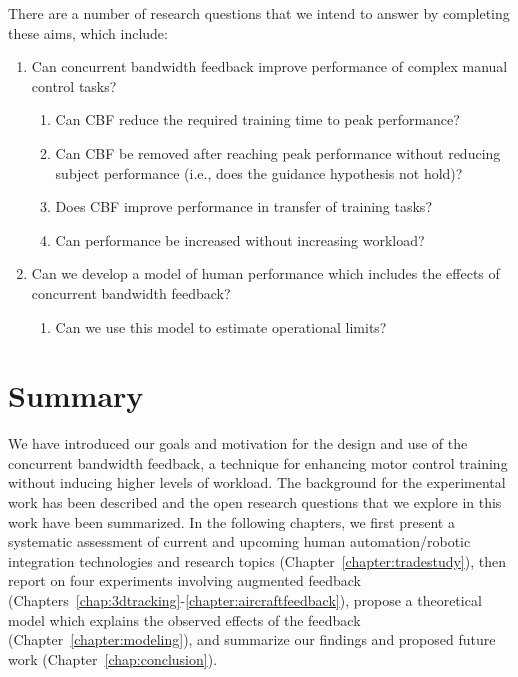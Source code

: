 There are a number of research questions that we intend to answer by completing these aims, which include:
\begin{enumerate}
    \item Can concurrent bandwidth feedback improve performance of complex manual control tasks?
          \begin{enumerate}
              \item Can CBF reduce the required training time to peak performance?
              \item Can CBF be removed after reaching peak performance without reducing subject performance (i.e., does the guidance hypothesis not hold)?
              \item Does CBF improve performance in transfer of training tasks?
              \item Can performance be increased without increasing workload?
          \end{enumerate}
    \item Can we develop a model of human performance which includes the effects of concurrent bandwidth feedback?
          \begin{enumerate}
              \item Can we use this model to estimate operational limits?
          \end{enumerate}
\end{enumerate}

\section{Summary}
We have introduced our goals and motivation for the design and use of the concurrent bandwidth feedback, a technique for enhancing motor control training without inducing higher levels of workload.
The background for the experimental work has been described and the open research questions that we explore in this work have been summarized.
In the following chapters, we first present a systematic assessment of current and upcoming human automation/robotic integration technologies and research topics (Chapter~\ref{chapter:tradestudy}), then report on four experiments involving augmented feedback (Chapters~\ref{chap:3dtracking}-\ref{chapter:aircraftfeedback}), propose a theoretical model which explains the observed effects of the feedback (Chapter~\ref{chapter:modeling}), and summarize our findings and proposed future work (Chapter~\ref{chap:conclusion}).
